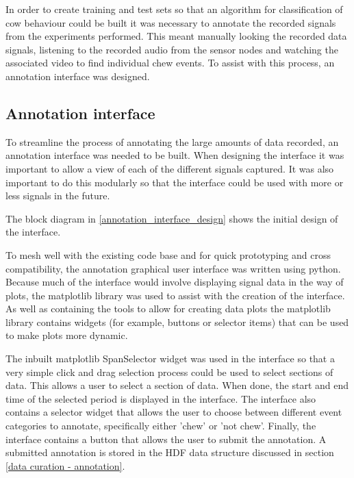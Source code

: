 In order to create training and test sets so that an algorithm for classification of cow behaviour could be built it was necessary to annotate the recorded signals from the experiments performed. This meant manually looking the recorded data signals, listening to the recorded audio from the sensor nodes and watching the associated video to find individual chew events. To assist with this process, an annotation interface was designed. 


\subsection{Annotation interface}

To streamline the process of annotating the large amounts of data recorded, an annotation interface was needed to be built. When designing the interface it was important to allow a view of each of the different signals captured. It was also important to do this modularly so that the interface could be used with more or less signals in the future. 

The block diagram in \ref{annotation_interface_design} shows the initial design of the interface. 


To mesh well with the existing code base and for quick prototyping and cross compatibility, the annotation graphical user interface was written using python. Because much of the interface would involve displaying signal data in the way of plots, the matplotlib library was used to assist with the creation of the interface. As well as containing the tools to allow for creating data plots the matplotlib library contains widgets (for example, buttons or selector items) that can be used to make plots more dynamic. 

The inbuilt matplotlib SpanSelector widget was used in the interface so that a very simple click and drag selection process could be used to select sections of data. This allows a user to select a section of data. When done, the start and end time of the selected period is displayed in the interface. The interface also contains a selector widget that allows the user to choose between different event categories to annotate, specifically either 'chew' or 'not chew'. Finally, the interface contains a button that allows the user to submit the annotation. A submitted annotation is stored in the HDF data structure discussed in section \ref{data curation - annotation}. 

